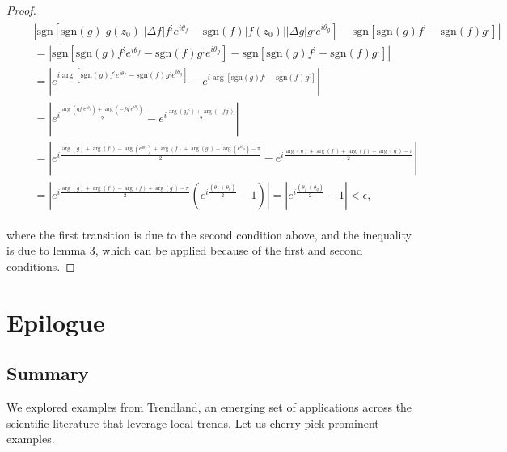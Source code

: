 \documentclass[11pt]{book}
\begin{document}
\begin{proof}
\begin{align}
&\begin{aligned}
&\left|\text{sgn}\left[\text{sgn}\left(g\right)\left|g\left(z_{0}\right)\right|\left|\Delta f\right|f^{;}e^{i\theta_{f}}-\text{sgn}\left(f\right)\left|f\left(z_{0}\right)\right|\left|\Delta g\right|g^{;}e^{i\theta_{g}}\right]-\text{sgn}\left[\text{sgn}\left(g\right)f^{;}-\text{sgn}\left(f\right)g^{;}\right]\right| \\
&=\left|\text{sgn}\left[\text{sgn}\left(g\right)f^{;}e^{i\theta_{f}}-\text{sgn}\left(f\right)g^{;}e^{i\theta_{g}}\right]-\text{sgn}\left[\text{sgn}\left(g\right)f^{;}-\text{sgn}\left(f\right)g^{;}\right]\right| \\
&=\left|e^{i\arg\left[\text{sgn}\left(g\right)f^{;}e^{i\theta_{f}}-\text{sgn}\left(f\right)g^{;}e^{i\theta_{g}}\right]}-e^{i\arg\left[\text{sgn}\left(g\right)f^{;}-\text{sgn}\left(f\right)g^{;}\right]}\right| \\
&=\left|e^{i\frac{\arg\left(gf^{;}e^{i\theta_{f}}\right)+\arg\left(-fg^{;}e^{i\theta_{g}}\right)}{2}}-e^{i\frac{\arg\left(gf^{;}\right)+\arg\left(-fg^{;}\right)}{2}}\right| \\
&=\left|e^{i\frac{\arg\left(g\right)+\arg\left(f^{;}\right)+\arg\left(e^{i\theta_{f}}\right)+\arg\left(f\right)+\arg\left(g^{;}\right)+\arg\left(e^{i\theta_{g}}\right)-\pi}{2}}-e^{i\frac{\arg\left(g\right)+\arg\left(f^{;}\right)+\arg\left(f\right)+\arg\left(g^{;}\right)-\pi}{2}}\right| \\
&=\left|e^{i\frac{\arg\left(g\right)+\arg\left(f^{;}\right)+\arg\left(f\right)+\arg\left(g^{;}\right)-\pi}{2}}\left(e^{i\frac{\left(\theta_{f}+\theta_{g}\right)}{2}}-1\right)\right|=\left|e^{i\frac{\left(\theta_{f}+\theta_{g}\right)}{2}}-1\right|<\epsilon,
\end{aligned}
\end{align}

where the first transition is due to the second condition above, and the inequality is due to lemma 3, which can be applied because of the first and second conditions.
\end{proof}

\part{Epilogue}
\chapter{Summary}
We explored examples from Trendland, an emerging set of applications across the scientific literature that leverage local trends. Let us cherry-pick prominent examples.
\end{document}
